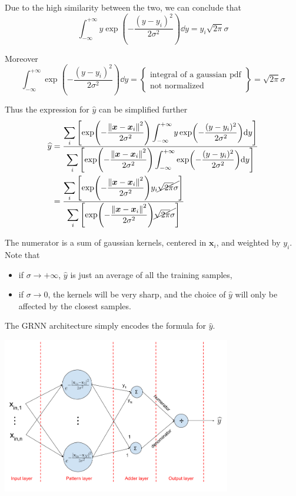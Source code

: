 \documentclass[oneside,onecolumn]{report}
\begin{document}
Due to the high similarity between the two, we can conclude that
$$ \int_{-\infty}^{+\infty} y \exp( - \frac{(y - y_i)^2}{2 \sigma^2}) \dd y = y_i \sqrt{2 \pi} \sigma $$

Moreover
$$ \int_{-\infty}^{+\infty} \exp( - \frac{(y - y_i)^2}{2 \sigma^2}) \dd y = \left\{ \substack{\text{integral of a gaussian pdf} \\ \text{not normalized}} \right\} = \sqrt{2 \pi} \sigma $$

Thus the expression for $\widehat y$ can be simplified further
\begin{align*}
    \widehat y
    &= \frac
    {\displaystyle
        \sum_i
        \left[
            \exp(- \frac{\norm{\bm x - \bm x_i}^2}{2 \sigma^2})
            \int_{-\infty}^{+\infty} y \exp( - \frac{(y - y_i)^2}{2 \sigma^2}) \dd y
        \right]
    }
    {\displaystyle
        \sum_i
        \left[
            \exp(- \frac{\norm{\bm x - \bm x_i}^2}{2 \sigma^2})
            \int_{-\infty}^{+\infty} \exp( - \frac{(y - y_i)^2}{2 \sigma^2}) \dd y
        \right]
    } \\
    &= \frac
    {\displaystyle
        \sum_i
        \left[
            \exp(- \frac{\norm{\bm x - \bm x_i}^2}{2 \sigma^2})
            y_i \cancel{\sqrt{2 \pi} \sigma}
        \right]
    }
    {\displaystyle
        \sum_i
        \left[
            \exp(- \frac{\norm{\bm x - \bm x_i}^2}{2 \sigma^2})
            \cancel{\sqrt{2 \pi} \sigma}
        \right]
    }
\end{align*}

The numerator is a sum of gaussian kernels, centered in $\bm x_i$, and weighted by $y_i$.
Note that
\begin{itemize}
    \item if $\sigma \to +\infty$, $\widehat y$ is just an average of all the training samples,
    \item if $\sigma \to 0$, the kernels will be very sharp, and the choice of $\widehat y$ will only be affected by the closest samples.
\end{itemize}

The GRNN architecture simply encodes the formula for $\widehat y$.

\begin{center}
    \includegraphics[width=10cm]{general_regression_neural_network.png}
\end{center}
\end{document}
